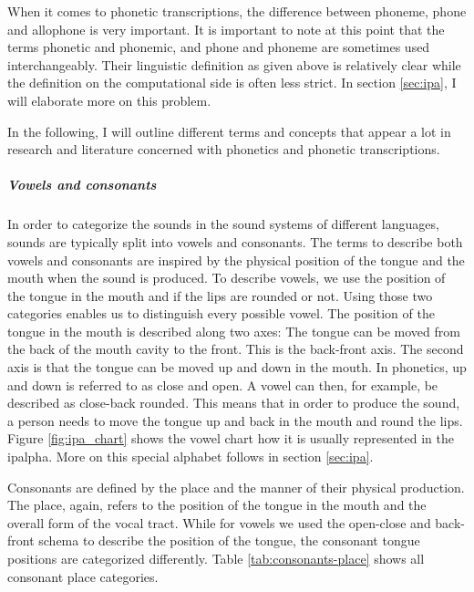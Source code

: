 When it comes to phonetic transcriptions, the difference between phoneme, phone and allophone is very important. It is important to note at this point that the terms phonetic and phonemic, and phone and phoneme are sometimes used interchangeably. Their linguistic definition as given above is relatively clear while the definition on the computational side is often less strict. In section \ref{sec:ipa}, I will elaborate more on this problem. 

In the following, I will outline different terms and concepts that appear a lot in research and literature concerned with phonetics and phonetic transcriptions.

\subparagraph{Vowels and consonants} In order to categorize the sounds in the sound systems of different languages, sounds are typically split into vowels and consonants. The terms to describe both vowels and consonants are inspired by the physical position of the tongue and the mouth when the sound is produced. To describe vowels, we use the position of the tongue in the mouth and if the lips are rounded or not. Using those two categories enables us to distinguish every possible vowel. The position of the tongue in the mouth is described along two axes: The tongue can be moved from the back of the mouth cavity to the front. This is the back-front axis. The second axis is that the tongue can be moved up and down in the mouth. In phonetics, up and down is referred to as close and open. A vowel can then, for example, be described as close-back rounded. This means that in order to produce the sound, a person needs to move the tongue up and back in the mouth and round the lips. Figure \ref{fig:ipa_chart} shows the vowel chart how it is usually represented in the \ac{ipalpha}. More on this special alphabet follows in section \ref{sec:ipa}. 

Consonants are defined by the place and the manner of their physical production. The place, again, refers to the position of the tongue in the mouth and the overall form of the vocal tract. While for vowels we used the open-close and back-front schema to describe the position of the tongue, the consonant tongue positions are categorized differently. Table \ref{tab:consonants-place} shows all consonant place categories.




